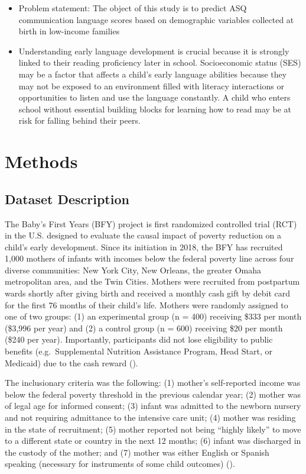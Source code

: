 \documentclass[sn-basic,pdflatex]{sn-jnl}
\providecommand{\tightlist}{%
  \setlength{\itemsep}{0pt}\setlength{\parskip}{0pt}}
\begin{document}
\begin{itemize}
\tightlist
\item
  Problem statement: The object of this study is to predict ASQ
  communication language scores based on demographic variables collected
  at birth in low-income families
\item
  Understanding early language development is crucial because it is
  strongly linked to their reading proficiency later in school.
  Socioeconomic status (SES) may be a factor that affects a child's
  early language abilities because they may not be exposed to an
  environment filled with literacy interactions or opportunities to
  listen and use the language constantly. A child who enters school
  without essential building blocks for learning how to read may be at
  risk for falling behind their peers.
\end{itemize}

\section{Methods}\label{methods}

\subsection{Dataset Description}\label{dataset-description}

The Baby's First Years (BFY) project is first randomized controlled
trial (RCT) in the U.S. designed to evaluate the causal impact of
poverty reduction on a child's early development. Since its initiation
in 2018, the BFY has recruited 1,000 mothers of infants with incomes
below the federal poverty line across four diverse communities: New York
City, New Orleans, the greater Omaha metropolitan area, and the Twin
Cities. Mothers were recruited from postpartum wards shortly after
giving birth and received a monthly cash gift by debit card for the
first 76 months of their child's life. Mothers were randomly assigned to
one of two groups: (1) an experimental group (n = 400) receiving \$333
per month (\$3,996 per year) and (2) a control group (n = 600) receiving
\$20 per month (\$240 per year). Importantly, participants did not lose
eligibility to public benefits (e.g.~Supplemental Nutrition Assistance
Program, Head Start, or Medicaid) due to the cash reward
(\citet{noble_babys_2021}).

The inclusionary criteria was the following: (1) mother's self-reported
income was below the federal poverty threshold in the previous calendar
year; (2) mother was of legal age for informed consent; (3) infant was
admitted to the newborn nursery and not requiring admittance to the
intensive care unit; (4) mother was residing in the state of
recruitment; (5) mother reported not being ``highly likely'' to move to
a different state or country in the next 12 months; (6) infant was
discharged in the custody of the mother; and (7) mother was either
English or Spanish speaking (necessary for instruments of some child
outcomes) (\citet{noble_babys_2021}).
\end{document}
